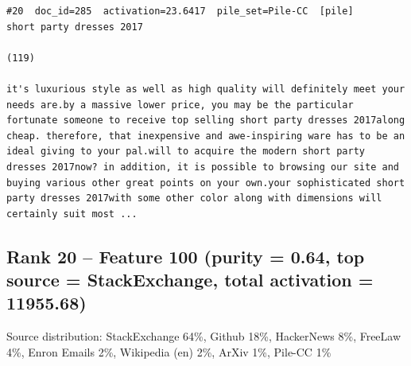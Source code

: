 \begin{verbatim}
#20  doc_id=285  activation=23.6417  pile_set=Pile-CC  [pile]
short party dresses 2017

(119)

it's luxurious style as well as high quality will definitely meet your needs are.by a massive lower price, you may be the particular fortunate someone to receive top selling short party dresses 2017along cheap. therefore, that inexpensive and awe-inspiring ware has to be an ideal giving to your pal.will to acquire the modern short party dresses 2017now? in addition, it is possible to browsing our site and buying various other great points on your own.your sophisticated short party dresses 2017with some other color along with dimensions will certainly suit most ...

\end{verbatim}

\subsection*{Rank 20 -- Feature 100 (purity = 0.64, top source = StackExchange, total activation = 11955.68)}

Source distribution: StackExchange 64\%, Github 18\%, HackerNews 8\%, FreeLaw 4\%, Enron Emails 2\%, Wikipedia (en) 2\%, ArXiv 1\%, Pile-CC 1\%

